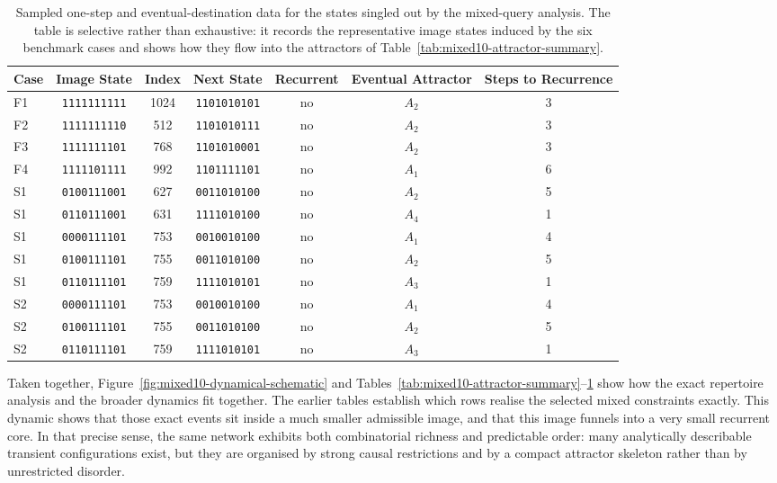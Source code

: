 \documentclass[11pt]{article}
\theoremstyle{definition}
\begin{document}
\begin{table}[t]
\centering
\setlength{\tabcolsep}{4pt}
\scriptsize
\begin{adjustbox}{max width=\textwidth,center}
\begin{tabular}{@{}lcccccc@{}}
\toprule
Case & Image State & Index & Next State & Recurrent & Eventual Attractor & Steps to Recurrence \\
\midrule
F1 & \texttt{1111111111} & 1024 & \texttt{1101010101} & no & \(A_2\) & 3 \\
F2 & \texttt{1111111110} & 512 & \texttt{1101010111} & no & \(A_2\) & 3 \\
F3 & \texttt{1111111101} & 768 & \texttt{1101010001} & no & \(A_2\) & 3 \\
F4 & \texttt{1111101111} & 992 & \texttt{1101111101} & no & \(A_1\) & 6 \\
S1 & \texttt{0100111001} & 627 & \texttt{0011010100} & no & \(A_2\) & 5 \\
S1 & \texttt{0110111001} & 631 & \texttt{1111010100} & no & \(A_4\) & 1 \\
S1 & \texttt{0000111101} & 753 & \texttt{0010010100} & no & \(A_1\) & 4 \\
S1 & \texttt{0100111101} & 755 & \texttt{0011010100} & no & \(A_2\) & 5 \\
S1 & \texttt{0110111101} & 759 & \texttt{1111010101} & no & \(A_3\) & 1 \\
S2 & \texttt{0000111101} & 753 & \texttt{0010010100} & no & \(A_1\) & 4 \\
S2 & \texttt{0100111101} & 755 & \texttt{0011010100} & no & \(A_2\) & 5 \\
S2 & \texttt{0110111101} & 759 & \texttt{1111010101} & no & \(A_3\) & 1 \\
\bottomrule
\end{tabular}
\end{adjustbox}
\caption{Sampled one-step and eventual-destination data for the states singled out by the mixed-query analysis. The table is selective rather than exhaustive: it records the representative image states induced by the six benchmark cases and shows how they flow into the attractors of Table~\ref{tab:mixed10-attractor-summary}.}
\label{tab:mixed10-dynamics-samples}
\end{table}

Taken together, Figure~\ref{fig:mixed10-dynamical-schematic} and Tables~\ref{tab:mixed10-attractor-summary}--\ref{tab:mixed10-dynamics-samples}
show how the exact repertoire analysis and the broader dynamics fit together. The earlier tables establish
which rows realise the selected mixed constraints exactly. This dynamic shows that
those exact events sit inside a much smaller admissible image, and that this image funnels into a very
small recurrent core. In that precise sense, the same network exhibits both combinatorial richness and
predictable order: many analytically describable transient configurations exist, but they are organised by
strong causal restrictions and by a compact attractor skeleton rather than by unrestricted disorder.
\end{document}
